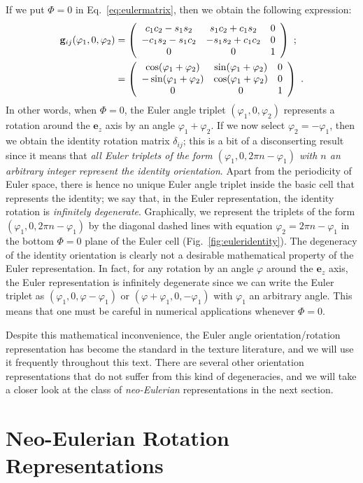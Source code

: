 If we put $\Phi=0$ in Eq.~\ref{eq:eulermatrix}, then we obtain the following expression:
\begin{align}
	\mathbf{g}_{ij}(\varphi_1,0,\varphi_2) &= \matrixtbt{c_1c_2-s_1s_2}{s_1c_2+c_1s_2}{0}
	{-c_1s_2-s_1c_2}{-s_1s_2+c_1c_2}{0}
	{0}{0}{1}\ ;\nonumber\\
	&= \matrixtbt{\cos(\varphi_1+\varphi_2)}{\sin(\varphi_1+\varphi_2)}{0} {-\sin(\varphi_1+\varphi_2)}{\cos(\varphi_1+\varphi_2)}{0} {0}{0}{1}\ .\label{eq:eulermatrix2}
\end{align}
In other words, when $\Phi=0$, the Euler angle triplet $(\varphi_1,0,\varphi_2)$ represents a rotation around the $\mathbf{e}_z$ axis by an angle $\varphi_1+\varphi_2$.  If we now select $\varphi_2=-\varphi_1$, then we obtain the identity rotation matrix $\delta_{ij}$; this is a bit of a disconserting result since it means that \textit{all Euler triplets of the form $(\varphi_1,0,2\pi n-\varphi_1)$ with $n$ an arbitrary integer represent the identity orientation}.  Apart from the periodicity of Euler space, there is hence no unique Euler angle triplet inside the basic cell that represents the identity; we say that, in the Euler representation, the identity rotation is \textit{infinitely degenerate}.  Graphically, we represent the triplets of the form $(\varphi_1,0,2\pi n-\varphi_1)$ by the diagonal dashed lines with equation $\varphi_2=2\pi n-\varphi_1$ in the bottom $\Phi=0$ plane of the Euler cell (Fig.~\ref{fig:euleridentity}).  The degeneracy of the identity orientation is clearly not a desirable mathematical property of the Euler representation.  In fact, for any rotation by an angle $\varphi$ around the $\mathbf{e}_z$ axis, the Euler representation is infinitely degenerate since we can write the Euler triplet as $(\varphi_1,0,\varphi-\varphi_1)$ or $(\varphi+\varphi_1,0,-\varphi_1)$ with $\varphi_1$ an arbitrary angle.  This means that one must be careful in numerical applications whenever $\Phi=0$.

Despite this mathematical inconvenience, the Euler angle orientation/rotation representation has become the standard in the texture literature, and we will use it frequently throughout this text.  There are several other orientation representations that do not suffer from this kind of degeneracies, and we will take a closer look at the class of \textit{neo-Eulerian} representations in the next section.


\section{Neo-Eulerian Rotation Representations\label{sec:neoEulerian}}









